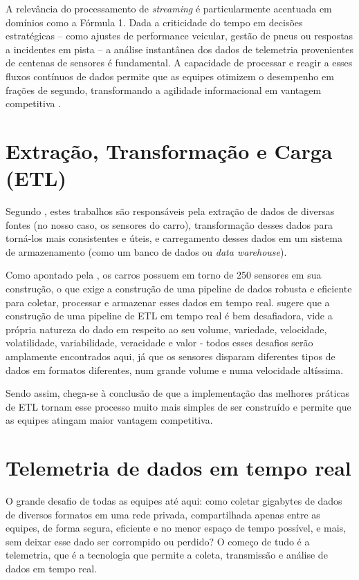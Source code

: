 \documentclass[12pt, %
openright, 
oneside, %
a4paper,    %
brazil]{facom-ufu-abntex2}
\begin{document}
A relevância do processamento de \textit{streaming} é particularmente acentuada em domínios como a 
Fórmula 1. Dada a criticidade do tempo em decisões estratégicas – como ajustes de performance 
veicular, gestão de pneus ou respostas a incidentes em pista – a análise instantânea dos dados de 
telemetria provenientes de centenas de sensores é fundamental. A capacidade de processar e reagir 
a esses fluxos contínuos de dados permite que as equipes otimizem o desempenho em frações de 
segundo, transformando a agilidade informacional em vantagem competitiva \cite{Mercedes}.

\section{Extração, Transformação e Carga (ETL)}
Segundo , estes trabalhos são responsáveis pela extração de dados
de diversas fontes (no nosso caso, os sensores do carro), transformação desses dados para torná-los mais
consistentes e úteis, e carregamento desses dados em um sistema de armazenamento (como um banco de dados ou \textit{data warehouse}).

Como apontado pela , os carros possuem em torno de 250 sensores em sua construção, o que exige a construção
de uma pipeline de dados robusta e eficiente para coletar, processar e armazenar esses dados em tempo real.  sugere que
a construção de uma pipeline de ETL em tempo real é bem desafiadora, vide a própria natureza do dado em respeito
ao seu volume, variedade, velocidade, volatilidade, variabilidade, veracidade e valor - todos esses desafios serão amplamente encontrados aqui,
já que os sensores disparam diferentes tipos de dados em formatos diferentes, num grande volume e numa velocidade
altíssima.

Sendo assim, chega-se à conclusão de que a implementação das melhores práticas de ETL tornam esse processo muito mais simples
de ser construído e permite que as equipes atingam maior vantagem competitiva.

\section{Telemetria de dados em tempo real}
O grande desafio de todas as equipes até aqui: como coletar gigabytes de dados de diversos formatos em uma rede privada, compartilhada apenas
entre as equipes, de forma segura, eficiente e no menor espaço de tempo possível, e mais, sem deixar esse dado ser corrompido ou perdido? 
O começo de tudo é a telemetria, que é a tecnologia que permite a coleta, transmissão e análise de dados em tempo real.
\end{document}
